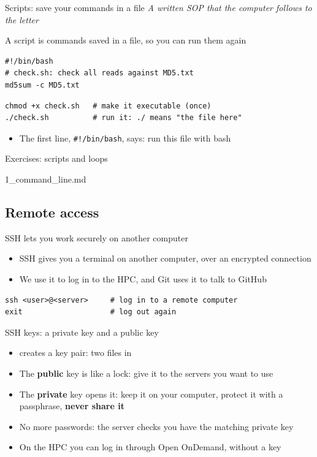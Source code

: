 \begin{frame}[fragile]{Scripts: save your commands in a file}
\emph{A written SOP that the computer follows to the letter}

\smallskip
A script is commands saved in a file, so you can run them again
\begin{lstlisting}
#!/bin/bash
# check.sh: check all reads against MD5.txt
md5sum -c MD5.txt
\end{lstlisting}
\begin{lstlisting}
chmod +x check.sh   # make it executable (once)
./check.sh          # run it: ./ means "the file here"
\end{lstlisting}
\begin{itemize}
    \item The first line, \texttt{\#!/bin/bash}, says: run this file with bash
\end{itemize}
\end{frame}

\begin{frame}{Exercises: scripts and loops}
\begin{exlist}{1_command_line.md}
\end{exlist}
\end{frame}

\subsection{Remote access}
\begin{frame}[fragile]{SSH lets you work securely on another computer}
\begin{itemize}
    \item SSH gives you a terminal on another computer, over an encrypted connection
    \item We use it to log in to the HPC, and Git uses it to talk to GitHub
\end{itemize}
\begin{lstlisting}
ssh <user>@<server>     # log in to a remote computer
exit                    # log out again
\end{lstlisting}
\end{frame}

\begin{frame}{SSH keys: a private key and a public key}

\bigskip
\small
\begin{itemize}
    \item {} creates a key pair: two files in 
    \item The \textbf{public} key is like a lock: give it to the servers you want to use
    \item The \textbf{private} key opens it: keep it on your computer, protect it with a passphrase, \textbf{never share it}
    \item No more passwords: the server checks you have the matching private key
    \item On the HPC you can log in through Open OnDemand, without a key
\end{itemize}
\end{frame}
